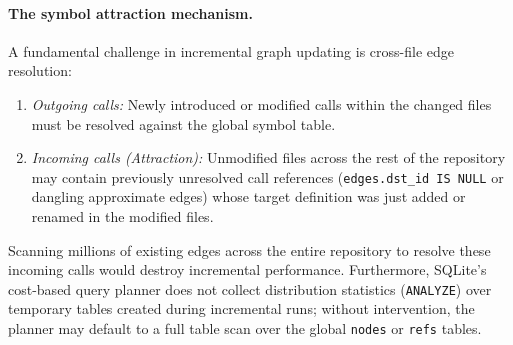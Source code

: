\paragraph{The symbol attraction mechanism.} A fundamental challenge in incremental graph updating is
cross-file edge resolution:
\begin{enumerate}
  \item \emph{Outgoing calls:} Newly introduced or modified calls within the changed files must be
        resolved against the global symbol table.
  \item \emph{Incoming calls (Attraction):} Unmodified files across the rest of the repository may contain
        previously unresolved call references (\texttt{edges.dst\_id IS NULL} or dangling approximate
        edges) whose target definition was just added or renamed in the modified files.
\end{enumerate}
Scanning millions of existing edges across the entire repository to resolve these incoming calls would
destroy incremental performance. Furthermore, SQLite's cost-based query planner does not collect
distribution statistics (\texttt{ANALYZE}) over temporary tables created during incremental runs;
without intervention, the planner may default to a full table scan over the global \texttt{nodes} or
\texttt{refs} tables.

